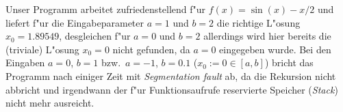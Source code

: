 
%

Unser Programm
arbeitet zufriedenstellend f"ur $f(x)=\sin(x)-x/2$
und liefert f"ur die Eingabeparameter $a=1$ und $b=2$ die richtige L"osung
$x_0=1.89549$, desgleichen f"ur $a=0$ und $b=2$
allerdings wird hier bereits die (triviale) L"osung $x_0=0$ nicht gefunden,
da $a=0$ eingegeben wurde. Bei den Eingaben
$a=0$, $b=1$ bzw.\  $a=-1$, $b=0.1$ ($x_0:=0 \in [a,b]$) bricht das Programm
nach einiger Zeit mit
\emph{Segmentation fault}
ab, da die Rekursion nicht
abbricht und irgendwann der f"ur Funktionsaufrufe reservierte Speicher
(\emph{Stack}) nicht mehr ausreicht.

